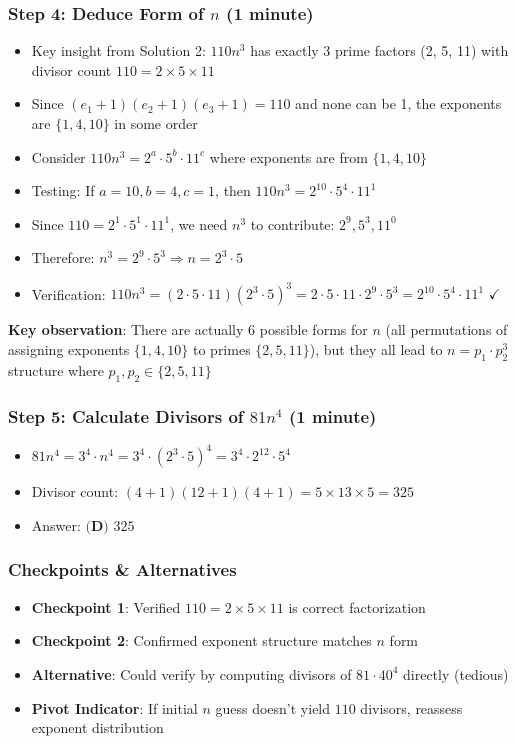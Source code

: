 \documentclass[]{article}
\begin{document}
\begin{solutionbox}
\subsubsection*{Step 4: Deduce Form of $n$ (1 minute)}
\begin{itemize}
    \item Key insight from Solution 2: $110n^3$ has exactly 3 prime factors (2, 5, 11) with divisor count $110 = 2 \times 5 \times 11$
    \item Since $(e_1+1)(e_2+1)(e_3+1) = 110$ and none can be 1, the exponents are $\{1, 4, 10\}$ in some order
    \item Consider $110n^3 = 2^{a} \cdot 5^{b} \cdot 11^{c}$ where exponents are from $\{1, 4, 10\}$
    \item Testing: If $a=10, b=4, c=1$, then $110n^3 = 2^{10} \cdot 5^4 \cdot 11^1$
    \item Since $110 = 2^1 \cdot 5^1 \cdot 11^1$, we need $n^3$ to contribute: $2^9, 5^3, 11^0$
    \item Therefore: $n^3 = 2^9 \cdot 5^3 \Rightarrow n = 2^3 \cdot 5$
    \item Verification: $110n^3 = (2 \cdot 5 \cdot 11)(2^3 \cdot 5)^3 = 2 \cdot 5 \cdot 11 \cdot 2^9 \cdot 5^3 = 2^{10} \cdot 5^4 \cdot 11^1$ $\checkmark$
\end{itemize}

\textbf{Key observation}: There are actually 6 possible forms for $n$ (all permutations of assigning exponents $\{1,4,10\}$ to primes $\{2,5,11\}$), but they all lead to $n = p_1 \cdot p_2^3$ structure where $p_1, p_2 \in \{2, 5, 11\}$

\subsubsection*{Step 5: Calculate Divisors of $81n^4$ (1 minute)}
\begin{itemize}
    \item $81n^4 = 3^4 \cdot n^4 = 3^4 \cdot (2^3 \cdot 5)^4 = 3^4 \cdot 2^{12} \cdot 5^4$
    \item Divisor count: $(4+1)(12+1)(4+1) = 5 \times 13 \times 5 = 325$
    \item Answer: $\boxed{\textbf{(D) } 325}$
\end{itemize}

\subsubsection*{Checkpoints \& Alternatives}
\begin{itemize}
    \item \textbf{Checkpoint 1}: Verified $110 = 2 \times 5 \times 11$ is correct factorization
    \item \textbf{Checkpoint 2}: Confirmed exponent structure matches $n$ form
    \item \textbf{Alternative}: Could verify by computing divisors of $81 \cdot 40^4$ directly (tedious)
    \item \textbf{Pivot Indicator}: If initial $n$ guess doesn't yield $110$ divisors, reassess exponent distribution
\end{itemize}
\end{solutionbox}
\end{document}
